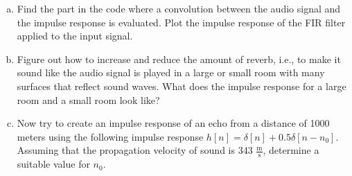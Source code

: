 \begin{enumerate}
\begin{enumerate}[a)]
          \item Find the part in the code where a convolution between the audio
                signal and the impulse response is evaluated. Plot the impulse
                response of the FIR filter applied to the input signal.

          \item Figure out how to increase and reduce the amount of reverb, i.e.,
                to make it sound like the audio signal is played in a large or small
                room with many surfaces that reflect sound waves. What does the
                impulse response for a large room and a small room look like?

          \item Now try to create an impulse response of an echo from a distance
                of 1000 meters using the following impulse response
                $h[n] = \delta[n] + 0.5\delta[n-n_0]$. Assuming that the propagation velocity of
                sound is 343 $\frac{\mathrm{m}}{\mathrm{s}}$, determine 
                a suitable value for $n_0$.
        \end{enumerate}

\end{enumerate}